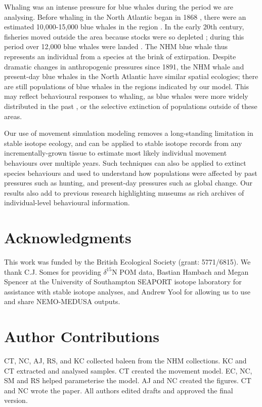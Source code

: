\documentclass[a4paper,12pt]{article}
\begin{document}
Whaling was an intense pressure for blue whales during the period we are analysing. 
Before whaling in the North Atlantic began in 1868 \cite{reilly2008balaenoptera}, there were an estimated 10,000-15,000 blue whales in the region \cite{sigurjonsson1995life}. 
In the early 20th century, fisheries moved outside the area because stocks were so depleted \cite{reilly2008balaenoptera}; during this period over 12,000 blue whales were landed \cite{sigurjonsson1995life}. 
The NHM blue whale thus represents an individual from a species at the brink of extirpation.
Despite dramatic changes in anthropogenic pressures since 1891, the NHM whale and present-day blue whales in the North Atlantic have similar spatial ecologies; there are still populations of blue whales in the regions indicated by our model. This may reflect behavioural responses to whaling, as blue whales were more widely distributed in the past \cite{reeves2004historical}, or the selective extinction of populations outside of these areas.

Our use of movement simulation modeling removes a long-standing limitation in stable isotope ecology, and can be applied to stable isotope records from any incrementally-grown tissue to estimate most likely individual movement behaviours over multiple years. 
Such techniques can also be applied to extinct species behaviours and used to understand how populations were affected by past pressures such as hunting, and present-day pressures such as global change. 
Our results also add to previous research \cite{lister2011natural,ryan2013stable} highlighting museums as rich archives of individual-level behavioural information.

\section{Acknowledgments}
This work was funded by the British Ecological Society (grant: 5771/6815). 
We thank C.J. Somes for providing  $\delta^{15}$N POM data, Bastian Hambach and Megan Spencer at the University of Southampton SEAPORT isotope laboratory for assistance with stable isotope analyses, and Andrew Yool for allowing us to use and share NEMO-MEDUSA outputs.

\section{Author Contributions}
CT, NC, AJ, RS, and KC collected baleen from the NHM collections. 
KC and CT extracted and analysed samples.
CT created the movement model.
EC, NC, SM and RS helped parameterise the model.
AJ and NC created the figures. 
CT and NC wrote the paper.
All authors edited drafts and approved the final version.
\end{document}
